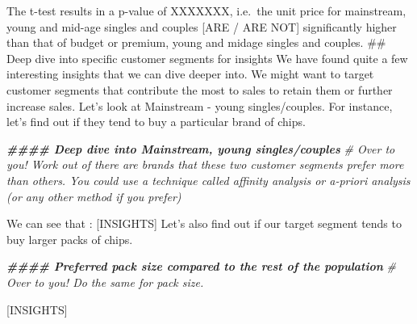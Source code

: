 \documentclass[
]{article}
\newenvironment{Shaded}{\begin{snugshade}}{\end{snugshade}}
\newcommand{\CommentTok}[1]{\textcolor[rgb]{0.56,0.35,0.01}{\textit{#1}}}
\newcommand{\DocumentationTok}[1]{\textcolor[rgb]{0.56,0.35,0.01}{\textbf{\textit{#1}}}}
\begin{document}
The t-test results in a p-value of XXXXXXX, i.e.~the unit price for
mainstream, young and mid-age singles and couples {[}ARE / ARE NOT{]}
significantly higher than that of budget or premium, young and midage
singles and couples. \#\# Deep dive into specific customer segments for
insights We have found quite a few interesting insights that we can dive
deeper into. We might want to target customer segments that contribute
the most to sales to retain them or further increase sales. Let's look
at Mainstream - young singles/couples. For instance, let's find out if
they tend to buy a particular brand of chips.

\begin{Shaded}
\begin{Highlighting}[]
\DocumentationTok{\#\#\#\# Deep dive into Mainstream, young singles/couples}
\CommentTok{\# Over to you! Work out of there are brands that these two customer segments prefer more than others. You could use a technique called affinity analysis or a{-}priori analysis (or any other method if you prefer)}
\end{Highlighting}
\end{Shaded}

We can see that : {[}INSIGHTS{]} Let's also find out if our target
segment tends to buy larger packs of chips.

\begin{Shaded}
\begin{Highlighting}[]
\DocumentationTok{\#\#\#\# Preferred pack size compared to the rest of the population}
\CommentTok{\# Over to you! Do the same for pack size.}
\end{Highlighting}
\end{Shaded}

{[}INSIGHTS{]}
\end{document}
